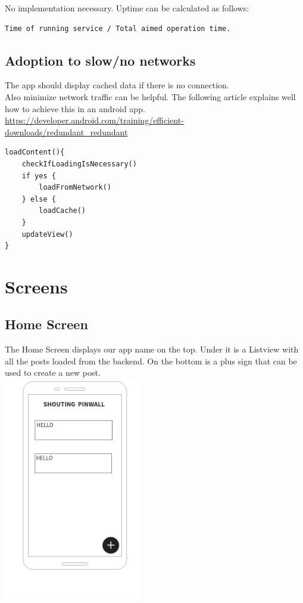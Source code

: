 \documentclass[conference]{IEEEtran}
\numberwithin{figure}{subsection}
\begin{document}
No implementation necessary. Uptime can be calculated as follows:

\begin{lstlisting}
Time of running service / Total aimed operation time.
\end{lstlisting}


\subsection{Adoption to slow/no networks}
The app should display cached data if there is no connection.\\

Also minimize network traffic can be helpful. The following article explains well how to achieve this in an android app.
\url{https://developer.android.com/training/efficient-downloads/redundant_redundant}

\begin{lstlisting}
loadContent(){
    checkIfLoadingIsNecessary()
    if yes {
        loadFromNetwork()
    } else {
        loadCache()
    }
    updateView()
}
\end{lstlisting}


\section{Screens}
\subsection{Home Screen}
The Home Screen displays our app name on the top. Under it is a Listview with all the posts loaded from the backend. On the bottom is a plus sign that can be used to create a new post.\\
\includegraphics[width=6cm]{bibtex/images/Home_Screen.png}
\end{document}
